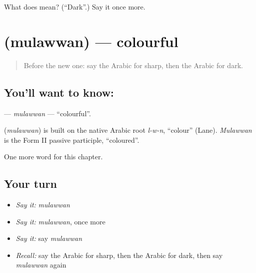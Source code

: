 \begin{tcolorbox}[breakable,colback=teal!4,colframe=teal!35!black,title={Before you move on}]
What does  mean? (\textquotedblleft{}Dark\textquotedblright{}.) Say it once more.
\end{tcolorbox}
\section[\texorpdfstring{\ar{ملون} (mulawwan)}{ملون (mulawwan)}]{ (mulawwan) — colourful}

\label{lesson:AR-C149-mulawwan}



\begin{quote}
Before the new one: say the Arabic for sharp, then the Arabic for dark.
\end{quote}

\subsection*{You'll want to know: }
\textbf{} — \emph{mulawwan} — \textquotedblleft{}colourful\textquotedblright{}.

\begin{cousinweb}
\textbf{} (\emph{mulawwan}) is built on the native Arabic root \emph{l-w-n}, \textquotedblleft{}colour\textquotedblright{} (Lane). \emph{Mulawwan} is the Form II passive participle, \textquotedblleft{}coloured\textquotedblright{}.
\end{cousinweb}

\begin{grammarlens}[title={What you've built}]
One more word for this chapter.
\end{grammarlens}

\subsection*{Your turn}
\begin{itemize}
\raggedright
  \item \emph{Say it:} \emph{mulawwan}
  \item \emph{Say it:} \emph{mulawwan}, once more
  \item \emph{Say it:} say \emph{mulawwan}
  \item \emph{Recall:} say the Arabic for sharp, then the Arabic for dark, then say \emph{mulawwan} again
\end{itemize}

